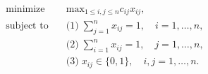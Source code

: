 \begin{align*}
\text{minimize} \quad & \text{max}_{1 \leq i, j \leq n} c_{ij} x_{ij}, \\
\text{subject to} \quad & \text{(1)} \; \sum_{j=1}^n x_{ij} = 1, \quad i = 1, \ldots, n,  \\
& \text{(2)} \; \sum_{i=1}^n x_{ij} = 1, \quad j = 1, \ldots, n,  \\
& \text{(3)} \; x_{ij} \in \lbrace 0, 1 \rbrace, \quad i,j = 1, \ldots,n.
\end{align*}
